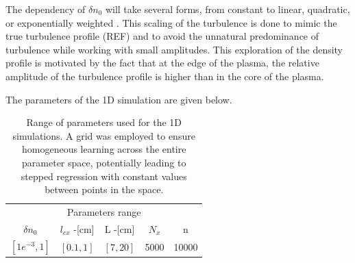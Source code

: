 \documentclass[11pt,a4paper,openany]{report}
\begin{document}
\begin{multicols}{2}
    The dependency of $\delta n_0$ will take several forms, from constant to linear, quadratic, or exponentially weighted \cite{SPR_Krutkin}. This scaling of the turbulence is done to mimic the true turbulence profile (REF) and to avoid the unnatural predominance of turbulence while working with small amplitudes. This exploration of the density profile is motivated by the fact that at the edge of the plasma, the relative amplitude of the turbulence profile is higher than in the core of the plasma.

    The parameters of the 1D simulation are given below.
    \setlength{\tabcolsep}{.03\linewidth}
    \renewcommand{\arraystretch}{1.4}
    \begin{center}
        \begin{table}[H]
            \begin{tabular}{ccccc}
                \toprule
                \multicolumn{5}{c}{Parameters range}                       \\
                \cmidrule{1 -5}
                $\delta n_0$   & $l_{cx}$ -[cm] & L -[cm]  & $N_x$ & n     \\
                \midrule
                $[1e^{-3}, 1]$ & $[0.1,1]$      & $[7,20]$ & 5000  & 10000 \\
                \bottomrule
            \end{tabular}
            \caption{Range of parameters used for the 1D simulations. A grid was employed to ensure homogeneous learning across the entire parameter space, potentially leading to stepped regression with constant values between points in the space.}
            \label{1d_params}
        \end{table}
    \end{center}

\end{multicols}
\end{document}
